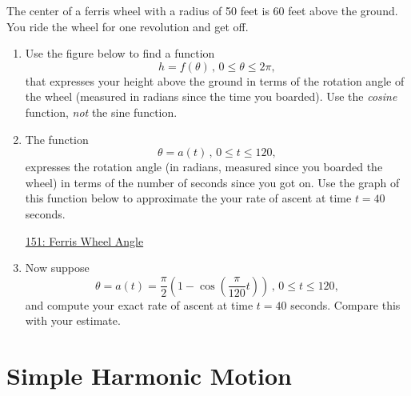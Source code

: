 \documentclass{ximera}
\begin{document}
\begin{question}  \label{Qd5t6dsfre6yuu}
The center of a ferris wheel with a radius of 50 feet is 60 feet above the ground. You ride the wheel for one revolution and get off.

\begin{enumerate}

\item Use the figure below to find a function 
\[
 h = f(\theta) \, , \, 0\leq \theta \leq 2\pi ,
\] 
that expresses your height above the ground in terms of the rotation angle of the wheel (measured in radians since the time you boarded). Use the \emph{cosine} function, \emph{not} the sine function.


\begin{onlineOnly}
    \begin{center}
\end{center}
\end{onlineOnly}


\item The function 
\[
    \theta = a(t) \, , \, 0\leq t \leq 120 ,
\]
expresses the rotation angle (in radians, measured since you boarded the wheel) in terms of the number of seconds since  you got on. Use the graph of this function below to approximate the your rate of ascent at time $t=40$ seconds. 

\begin{onlineOnly}
    \begin{center}
\end{center}
\end{onlineOnly}

\href{https://www.desmos.com/calculator/kijv21gots}{151: Ferris Wheel Angle}



\item Now suppose
\[
    \theta = a(t) = \frac{\pi}{2}\left(1- \cos \left( \frac{\pi}{120}t \right)    \right) \, , \, 0\leq t \leq 120 ,
\]
and compute your exact rate of ascent at time $t=40$ seconds. Compare this with your estimate.

\end{enumerate}
\end{question}



\section{Simple Harmonic Motion}
\end{document}
